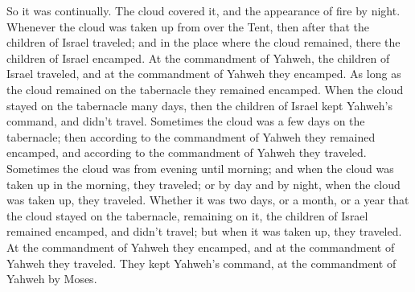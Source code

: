 {So it was continually. The cloud covered it, and the appearance of fire by night.
Whenever the cloud was taken up from over the Tent, then after that the children of Israel traveled; and in the place where the cloud remained, there the children of Israel encamped.
At the commandment of Yahweh, the children of Israel traveled, and at the commandment of Yahweh they encamped. As long as the cloud remained on the tabernacle they remained encamped.
When the cloud stayed on the tabernacle many days, then the children of Israel kept Yahweh’s command, and didn’t travel.
Sometimes the cloud was a few days on the tabernacle; then according to the commandment of Yahweh they remained encamped, and according to the commandment of Yahweh they traveled.
Sometimes the cloud was from evening until morning; and when the cloud was taken up in the morning, they traveled; or by day and by night, when the cloud was taken up, they traveled.
Whether it was two days, or a month, or a year that the cloud stayed on the tabernacle, remaining on it, the children of Israel remained encamped, and didn’t travel; but when it was taken up, they traveled.
At the commandment of Yahweh they encamped, and at the commandment of Yahweh they traveled. They kept Yahweh’s command, at the commandment of Yahweh by Moses.

}
